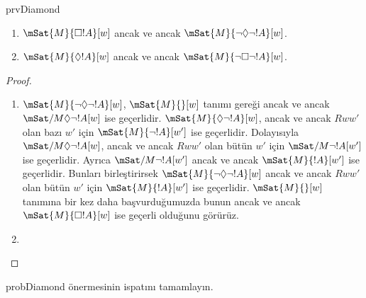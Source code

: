 \documentclass[../../../include/open-logic-section]{subfiles}
\begin{document}
\begin{tagblock}{prvDiamond}
\begin{prop}
  \begin{enumerate}
  \item $\mSat{M}{\Box !A}[w]$ ancak ve ancak
    $\mSat{M}{\lnot\Diamond\lnot !A}[w]$.
  \item $\mSat{M}{\Diamond !A}[w]$ ancak ve ancak
    $\mSat{M}{\lnot\Box\lnot !A}[w]$.
  \end{enumerate}
\end{prop}

\begin{proof}
  \begin{enumerate}
    \item $\mSat{M}{\lnot\Diamond\lnot !A}[w]$, $\mSat{M}{}[w]$ tanımı
      gereği ancak ve ancak $\mSat/{M}{\Diamond\lnot !A}[w]$ ise geçerlidir.
      $\mSat{M}{\Diamond\lnot !A}[w]$, ancak ve ancak $Rww'$ olan bazı
      $w'$ için $\mSat{M}{\lnot !A}[w']$ ise geçerlidir. Dolayısıyla
      $\mSat/{M}{\Diamond\lnot !A}[w]$, ancak ve ancak $Rww'$ olan bütün
      $w'$ için $\mSat/{M}{\lnot !A}[w']$ ise geçerlidir. Ayrıca
      $\mSat/{M}{\lnot !A}[w']$ ancak ve ancak $\mSat{M}{!A}[w']$ ise
      geçerlidir. Bunları birleştirirsek
      $\mSat{M}{\lnot\Diamond\lnot !A}[w]$ ancak ve ancak $Rww'$ olan bütün
      $w'$ için $\mSat{M}{!A}[w']$ ise geçerlidir. $\mSat{M}{}[w]$ tanımına
      bir kez daha başvurduğumuzda bunun ancak ve ancak
      $\mSat{M}{\Box !A}[w]$ ise geçerli olduğunu görürüz.
    \item {}
  \end{enumerate}
\end{proof}

\begin{probtag}{probDiamond}
   önermesinin ispatını tamamlayın.
\end{probtag}
\end{tagblock}
\end{document}
